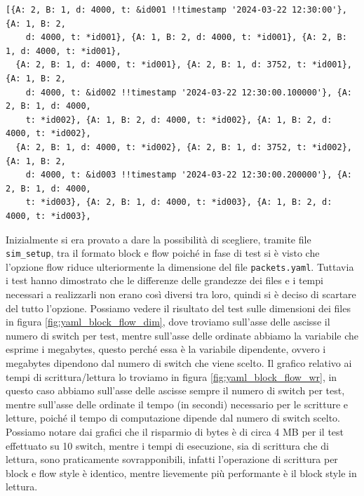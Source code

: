 \documentclass[binding=0.6cm]{sapthesis}
\begin{document}
{\scriptsize %
\begin{lstlisting}[caption={Rappresentazione dei pacchetti con stile yaml flow style}, label={codice:long_description_packet}, breaklines=true]
[{A: 2, B: 1, d: 4000, t: &id001 !!timestamp '2024-03-22 12:30:00'}, {A: 1, B: 2,
    d: 4000, t: *id001}, {A: 1, B: 2, d: 4000, t: *id001}, {A: 2, B: 1, d: 4000, t: *id001},
  {A: 2, B: 1, d: 4000, t: *id001}, {A: 2, B: 1, d: 3752, t: *id001}, {A: 1, B: 2,
    d: 4000, t: &id002 !!timestamp '2024-03-22 12:30:00.100000'}, {A: 2, B: 1, d: 4000,
    t: *id002}, {A: 1, B: 2, d: 4000, t: *id002}, {A: 1, B: 2, d: 4000, t: *id002},
  {A: 2, B: 1, d: 4000, t: *id002}, {A: 2, B: 1, d: 3752, t: *id002}, {A: 1, B: 2,
    d: 4000, t: &id003 !!timestamp '2024-03-22 12:30:00.200000'}, {A: 2, B: 1, d: 4000,
    t: *id003}, {A: 2, B: 1, d: 4000, t: *id003}, {A: 1, B: 2, d: 4000, t: *id003},
\end{lstlisting}
}
Inizialmente si era provato a dare la possibilità di scegliere, tramite file \texttt{sim\_setup}, 
tra il formato block e flow poiché in fase di test
si è visto che l'opzione flow riduce ulteriormente la dimensione del file \texttt{packets.yaml}. Tuttavia i test hanno dimostrato che le differenze delle grandezze
dei files e i tempi necessari a realizzarli non erano così diversi tra loro, quindi si è deciso di scartare del tutto l'opzione. Possiamo vedere
il risultato del test sulle dimensioni dei files in figura \ref{fig:yaml_block_flow_dim}, dove troviamo sull'asse delle ascisse il numero di switch per test, mentre
sull'asse delle ordinate abbiamo la variabile che esprime i megabytes, questo perché essa è la variabile dipendente, ovvero i megabytes dipendono dal numero di switch
che viene scelto. Il grafico relativo ai tempi di scrittura/lettura lo troviamo in 
figura \ref{fig:yaml_block_flow_wr}, in questo caso abbiamo sull'asse delle ascisse sempre il numero di switch per test, mentre sull'asse delle ordinate
il tempo (in secondi) necessario per le scritture e letture, poiché il tempo di computazione dipende dal numero di switch scelto. Possiamo notare dai grafici che il risparmio di bytes è di circa 4 MB per il test effettuato su 10 switch, mentre
i tempi di esecuzione, sia di scrittura che di lettura, sono praticamente sovrapponibili, infatti l'operazione di scrittura per block e flow style è identico, mentre lievemente
più performante è il block style in lettura.
\end{document}
